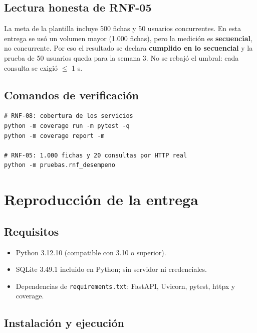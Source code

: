\documentclass[11pt,a4paper]{article}
\newcommand{\code}[1]{\texttt{#1}}
\begin{document}
\subsection{Lectura honesta de RNF-05}

La meta de la plantilla incluye 500 fichas y 50 usuarios concurrentes. En esta
entrega se usó un volumen mayor (1.000 fichas), pero la medición es
\textbf{secuencial}, no concurrente. Por eso el resultado se declara
\textbf{cumplido en lo secuencial} y la prueba de 50 usuarios queda para la
semana 3. No se rebajó el umbral: cada consulta se exigió $\leq$ 1 s.

\subsection{Comandos de verificación}

\begin{lstlisting}
# RNF-08: cobertura de los servicios
python -m coverage run -m pytest -q
python -m coverage report -m

# RNF-05: 1.000 fichas y 20 consultas por HTTP real
python -m pruebas.rnf_desempeno
\end{lstlisting}

\clearpage

\section{Reproducción de la entrega}

\subsection{Requisitos}

\begin{itemize}
\item Python 3.12.10 (compatible con 3.10 o superior).
\item SQLite 3.49.1 incluido en Python; sin servidor ni credenciales.
\item Dependencias de \code{requirements.txt}: FastAPI, Uvicorn, pytest, httpx
  y coverage.
\end{itemize}

\subsection{Instalación y ejecución}
\end{document}
